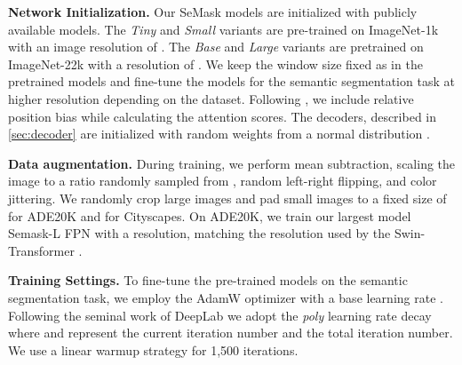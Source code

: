 \documentclass[10pt,twocolumn,letterpaper]{article}
\newcommand{\vspaceundertab}{\vspace{-.2cm}}
\begin{document}
\begin{table}
  \centering
  \fontsize{10}{12}\selectfont
  \vspaceundertab
  \caption{\textbf{Details of Swin Transformer variants.} The \textit{Tiny} and \textit{Small} variants are trained on ImageNet-1k and with  resolution.  stands for ImageNet-22k pre-training on  resolution images.}
    \label{tab:swin_desc}
\end{table}

\noindent \textbf{Network Initialization.} Our SeMask models are 
initialized with publicly available models. The \textit{Tiny} and \textit{Small} variants are pre-trained on ImageNet-1k with an image resolution of . The \textit{Base} and \textit{Large} variants are pretrained on ImageNet-22k with a resolution of . We keep the window size  fixed as in the pretrained models and fine-tune the models for the semantic segmentation task at higher resolution depending on the dataset. Following \cite{swin-T}, we include relative position bias while calculating the attention scores. The decoders, described in \cref{sec:decoder} are initialized with random weights from a normal distribution \cite{init}.

\noindent \textbf{Data augmentation.} During training, we perform mean subtraction, scaling the image to a ratio randomly sampled from , random left-right flipping, and color jittering. We randomly crop large images and pad small images to a fixed size of  for ADE20K and  for Cityscapes. On ADE20K, we train our largest model Semask-L FPN with a  resolution, matching the resolution used by the Swin-Transformer \cite{swin-T}.

\noindent \textbf{Training Settings.} To fine-tune the pre-trained models on the semantic segmentation task, we employ the AdamW \cite{adamW} optimizer with a base learning rate . Following the seminal work of DeepLab \cite{deeplabv1} we adopt the \textit{poly} learning rate decay  where  and  represent the current iteration number and the total iteration number. We use a linear warmup strategy for 1,500 iterations.
\end{document}
